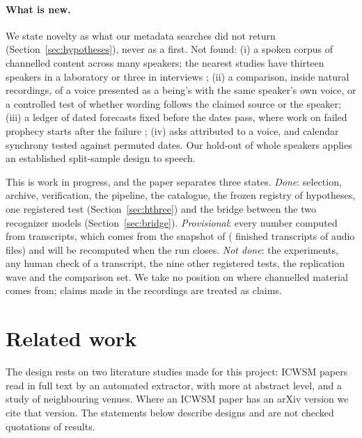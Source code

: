 \documentclass[letterpaper]{article} %
\newcommand{\snap}{snapshot of \SnapDate{} (\SnapLines{} finished transcripts of \NRunAudio{} audio files)}
\begin{document}
\paragraph{What is new.} We state novelty as what our metadata searches did not return (Section~\ref{sec:hypotheses}), never as a first. Not found: (i) a spoken corpus of channelled content across many speakers; the nearest studies have thirteen speakers in a laboratory \cite{wahbeh2019physiological} or three in interviews \cite{wahbeh2026semantic}; (ii) a comparison, inside natural recordings, of a voice presented as a being's with the same speaker's own voice, or a controlled test of whether wording follows the claimed source or the speaker; (iii) a ledger of dated forecasts fixed before the dates pass, where work on failed prophecy starts after the failure \cite{dawson1999prophecy,kelly2026debunking}; (iv) asks attributed to a voice, and calendar synchrony tested against permuted dates. Our hold-out of whole speakers applies an established split-sample design \cite{egami2022make,fafchamps2017using} to speech.

This is work in progress, and the paper separates three states. \emph{Done}: selection, archive, verification, the pipeline, the catalogue, the frozen registry of hypotheses, one registered test (Section~\ref{sec:hthree}) and the bridge between the two recognizer models (Section~\ref{sec:bridge}). \emph{Provisional}: every number computed from transcripts, which comes from the \snap{} and will be recomputed when the run closes. \emph{Not done}: the experiments, any human check of a transcript, the nine other registered tests, the replication wave and the comparison set. We take no position on where channelled material comes from; claims made in the recordings are treated as claims.

\section{Related work}
\label{sec:related}

The design rests on two literature studies made for this project: \NIcwsmReadFull{} ICWSM papers read in full text by an automated extractor, with \NIcwsmReadAbstract{} more at abstract level, and a study of neighbouring venues. Where an ICWSM paper has an arXiv version we cite that version. The statements below describe designs and are not checked quotations of results.
\end{document}
